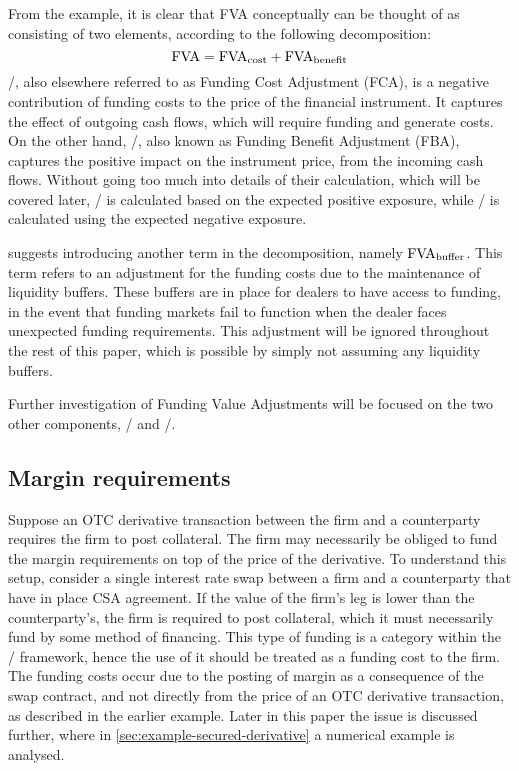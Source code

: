 \documentclass[main.tex]{subfiles}
\begin{document}
        From the example, it is clear that FVA conceptually can be thought of 
        as consisting of two elements, according to the following decomposition:
        \begin{equation}
            \FVA/ = \FCA/ + \FBA/
        \end{equation}
        \FCA/, also elsewhere referred to as Funding Cost Adjustment (FCA), 
        is a negative contribution of funding costs to the price of the financial instrument.
        It captures the effect of outgoing cash flows, which will require funding and generate costs.
        On the other hand, \FBA/, also known as Funding Benefit Adjustment (FBA), 
        captures the positive impact on the instrument price, from the incoming cash flows.
        Without going too much into details of their calculation, which will be covered later,
        \FCA/ is calculated based on the expected positive exposure, 
        while \FBA/ is calculated using the expected negative exposure. 

        \textcite{KPMGFVA} suggests introducing another term in the decomposition, namely
        $\FVA/_{\text{buffer}}$.
        This term refers to an adjustment for the funding costs
        due to the maintenance of liquidity buffers. 
        These buffers are in place for dealers to have access to funding, in the event
        that funding markets fail to function when the dealer faces unexpected funding requirements.
        This adjustment will be ignored throughout the rest of this paper, 
        which is possible by simply not assuming any liquidity buffers. 
        
        Further investigation of Funding Value Adjustments will be focused on the two other components,
        \FCA/ and \FBA/.

        \subsection*{Margin requirements}
            Suppose an OTC derivative transaction between the firm and a counterparty requires the firm to post collateral.
            The firm may necessarily be obliged to fund the margin requirements on top of the price of the derivative.
            To understand this setup,
            consider a single interest rate swap between a firm and a counterparty that have in place CSA agreement.
            If the value of the firm's leg is lower than the counterparty's,
            the firm is required to post collateral, 
            which it must necessarily fund by some method of financing.
            This type of funding is a category within the \FVA/ framework, 
            hence the use of it should be treated as a funding cost to the firm.
            The funding costs occur due to the posting of margin as a consequence of the swap contract,
            and not directly from the price of an OTC derivative transaction,
            as described in the earlier example.
            Later in this paper the issue is discussed further, 
            where in \cref{sec:example-secured-derivative} a numerical example is analysed.
            
\end{document}
